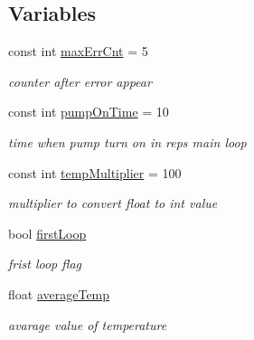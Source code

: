 \subsection*{Variables}
\begin{DoxyCompactItemize}
\item 
\mbox{\label{_arduino_8ino_aaaf39ca8a530c18f5b676653226ed2d2}} 
const int \hyperlink{_arduino_8ino_aaaf39ca8a530c18f5b676653226ed2d2}{max\+Err\+Cnt} = 5
\begin{DoxyCompactList}\small\item\em counter after error appear \end{DoxyCompactList}\item 
\mbox{\label{_arduino_8ino_a0cb31a1609e2113fa6e0f347ac1e660f}} 
const int \hyperlink{_arduino_8ino_a0cb31a1609e2113fa6e0f347ac1e660f}{pump\+On\+Time} = 10
\begin{DoxyCompactList}\small\item\em time when pump turn on in reps main loop \end{DoxyCompactList}\item 
\mbox{\label{_arduino_8ino_af2c91a05f64d5c55fb0789a2b8e11d04}} 
const int \hyperlink{_arduino_8ino_af2c91a05f64d5c55fb0789a2b8e11d04}{temp\+Multiplier} = 100
\begin{DoxyCompactList}\small\item\em multiplier to convert float to int value \end{DoxyCompactList}\item 
\mbox{\label{_arduino_8ino_ad777e59aed9e79afa28b5391460429d6}} 
bool \hyperlink{_arduino_8ino_ad777e59aed9e79afa28b5391460429d6}{first\+Loop}
\begin{DoxyCompactList}\small\item\em frist loop flag \end{DoxyCompactList}\item 
\mbox{\label{_arduino_8ino_a2535ed80a26087634b035a74cceecaa3}} 
float \hyperlink{_arduino_8ino_a2535ed80a26087634b035a74cceecaa3}{average\+Temp}
\begin{DoxyCompactList}\small\item\em avarage value of temperature \end{DoxyCompactList}\item 

\end{DoxyCompactItemize}
